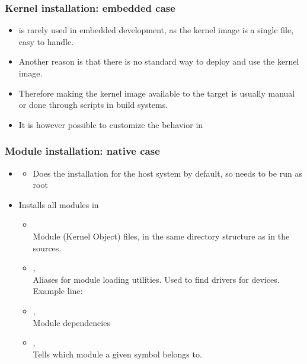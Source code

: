 \begin{frame}
  \frametitle{Kernel installation: embedded case}
  \begin{itemize}
  \item {} is rarely used in embedded development, as the
    kernel image is a single file, easy to handle.
  \item Another reason is that there is no standard way to deploy and
    use the kernel image.
  \item Therefore making the kernel image available to the target is
    usually manual or done through scripts in build systems.
  \item It is however possible to customize the 
    behavior in 
  \end{itemize}
\end{frame}

\begin{frame}
  \frametitle{Module installation: native case}
  \begin{itemize}
  \item {}
    \begin{itemize}
    \item Does the installation for the host system by default, so
      needs to be run as root
    \end{itemize}
  \item Installs all modules in 
    \begin{itemize}
    \item {}\\
      Module  (Kernel Object) files, in the same directory
      structure as in the sources.
    \item {}, \\
      Aliases for module loading utilities. Used to find drivers for
      devices. Example line:\\
    \item {}, \\
      Module dependencies
    \item {}, \\
      Tells which module a given symbol belongs to.
    \end{itemize}
  \end{itemize}
\end{frame}

